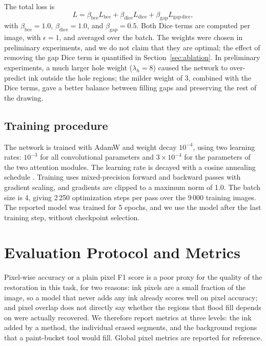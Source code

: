 \documentclass[11pt]{article}
\begin{document}
The total loss is
\begin{equation}
  L = \beta_{\mathrm{bce}} L_{\mathrm{bce}} + \beta_{\mathrm{dice}} L_{\mathrm{dice}}
  + \beta_{\mathrm{gap}} L_{\mathrm{gap\,dice}},
\end{equation}
with $\beta_{\mathrm{bce}} = 1.0$, $\beta_{\mathrm{dice}} = 1.0$, and
$\beta_{\mathrm{gap}} = 0.5$. Both Dice terms are computed per image, with
$\epsilon = 1$, and averaged over the batch. The weights were chosen in preliminary
experiments, and we do not claim that they are optimal; the effect of removing the
gap Dice term is quantified in Section~\ref{sec:ablation}. In preliminary experiments, a much larger hole weight
($\lambda_h = 8$) caused the network to over-predict ink outside the hole regions;
the milder weight of 3, combined with the Dice terms, gave a better balance between
filling gaps and preserving the rest of the drawing.

\subsection{Training procedure}

The network is trained with AdamW \citep{loshchilov2019adamw} and weight decay
$10^{-4}$, using two learning rates: $10^{-3}$ for all convolutional parameters and
$3\times 10^{-4}$ for the parameters of the two attention modules. The learning
rate is decayed with a cosine annealing schedule \citep{loshchilov2017sgdr}. Training uses mixed-precision forward and backward passes
with gradient scaling, and gradients are clipped to a maximum norm of 1.0. The batch
size is 4, giving 2\,250 optimization steps per pass over the 9\,000 training images.
The reported model was trained for 5 epochs, and we use the model after the last
training step, without checkpoint selection.

\section{Evaluation Protocol and Metrics}
\label{sec:metrics}

Pixel-wise accuracy or a plain pixel F1 score is a poor proxy for the quality of the
restoration in this task, for two reasons: ink pixels are a small fraction of the
image, so a model that never adds any ink already scores well on pixel accuracy;
and pixel overlap does not directly say whether the regions that flood fill depends
on were actually recovered. We therefore report metrics at three levels: the ink
added by a method, the individual erased segments, and the background regions that a
paint-bucket tool would fill. Global pixel metrics are reported for reference.
\end{document}
